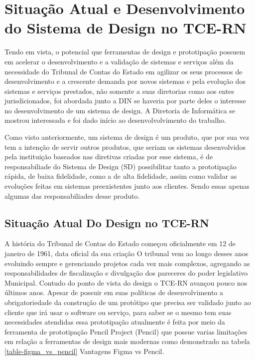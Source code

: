 \chapter[Capítulo 3]{Situação Atual e Desenvolvimento do Sistema de Design no TCE-RN}
\label{ch:cap3}

  Tendo em vista, o potencial que ferramentas de design e prototipação possuem em acelerar o desenvolvimento e a validação de sistemas e serviços além da necessidade do Tribunal de Contas do Estado em agilizar os seus processos de desenvolvimento e a crescente demanda por novos sistemas e pela evolução dos sistemas e serviços prestados, não somente a suas diretorias como aos entes jurisdicionados, foi abordada junto a DIN se haveria por parte deles o interesse no desenvolvimento de um sistema de design. A Diretoria de Informática se mostrou interessada e foi dado início ao desenvolvolvimento do trabalho.

  Como visto anteriormente, um sistema de design é um produto, que por sua vez tem a intenção de servir outros produtos, que seriam os sistemas desenvolvidos pela instituição baseados nas diretivas criadas por esse sistema, é de responsabiliade do Sistema de Design (SD) possibilitar tanto a prototipação rápida, de baixa fidelidade, como a de alta fidelidade, assim como validar as evoluções feitas em sistemas preexistentes junto aos clientes. Sendo essas apenas algumas das responsabiliades desse produto.

\section{Situação Atual Do Design no TCE-RN} \label{secao31}
  A história do Tribunal de Contas do Estado começou oficialmente em 12 de janeiro de 1961, data oficial da sua criação \cite{historia_tribunal} O tribunal vem ao longo desses anos evoluindo sempre e gerenciando projetos cada vez mais complexos, agregando as responsabilidades de fiscalização e divulgação dos pareceres do poder legislativo Municipal. Contudo do ponto de vista do design o TCE-RN avançou pouco nos últimos anos. Apesar de possuir em suas políticas de desenvolvimento a obrigatoriedade da construção de um protótipo que precisa ser validado junto ao cliente que irá usar o software ou serviço, para saber se o mesmo tem suas necessidades atendidas essa prototipação atualmente é feita por meio da ferramenta de prototipação Pencil Project (Pencil) que possue varias limitações em relação a ferramentas de design mais modernas como demonstrado na tabela \ref{table-figma_vs_pencil} Vantagens Figma vs Pencil.

